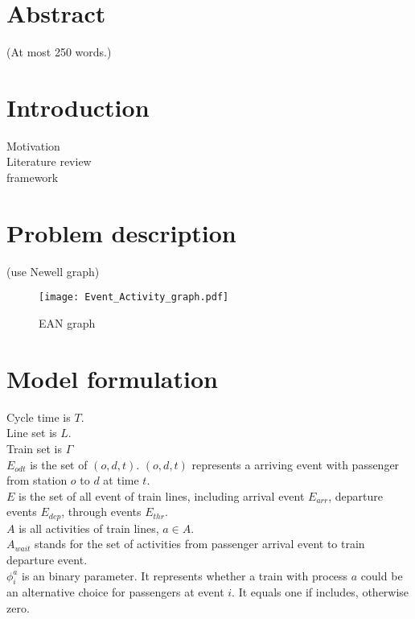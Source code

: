 \documentclass[titlepage,oneside,letterpage,12pt]{article}
\newcommand{\trbcite}[1]{\citeauthor{#1} ({\it \citenum{#1}})}
\begin{document}

\newpage
\section{Abstract}
(At most 250 words.)


\newpage
\section{Introduction}
Motivation\\
Literature review\\
framework

\section{Problem description}
(use Newell graph)
\begin{figure}[htbp]
	\centering
	\texttt{[image: Event\_Activity\_graph.pdf]}
	\caption{EAN graph}
	\label{fig:1}
\end{figure}

\newpage
\section{Model formulation}
Cycle time is $T$.\\ 
Line set is $L$.\\ 
Train set is $\varGamma$\\
$E_{odt}$ is the set of $(o,d,t)$. $(o,d,t)$ represents a arriving event with passenger from station $o$ to $d$ at time $t$. \\
$E$ is the set of all event of train lines, including arrival event $E_{arr}$, departure events $E_{dep}$, through events $E_{thr}$.\\
$A$ is all activities of train lines, $a \in A$.\\
$A_{wait}$ stands for the set of activities from passenger arrival event to train departure event.\\
$\phi_i^a$ is an binary parameter. It represents whether a train with process $a$ could be an alternative choice for passengers at event $i$. It equals one if includes, otherwise zero.
\end{document}
